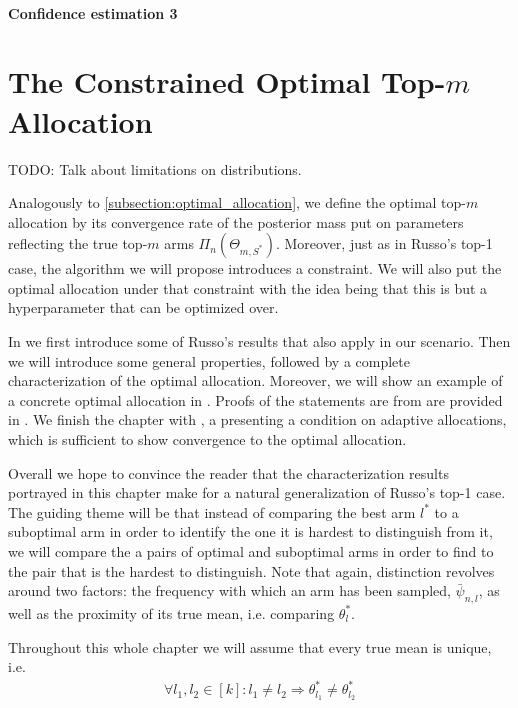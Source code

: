 \subsubsection{Confidence estimation 3}


\chapter{The Constrained Optimal Top-$m$ Allocation}

TODO: Talk about limitations on distributions.

Analogously to \ref{subsection:optimal_allocation}, we define the optimal top-$m$ allocation by its convergence rate of the posterior mass put on parameters reflecting the true top-$m$ arms $\Pi_n(\Theta_{m, S^*})$. Moreover, just as in Russo's top-1 case, the algorithm we will propose introduces a constraint. We will also put the optimal allocation under that constraint with the idea being that this is but a hyperparameter that can be optimized over.

In  we first introduce some of Russo's results that also apply in our scenario. Then we will introduce some general properties, followed by a complete characterization of the optimal allocation. Moreover, we will show an example of a concrete optimal allocation in . Proofs of the statements are from  are provided in . We finish the chapter with , a presenting a condition on adaptive allocations, which is sufficient to show convergence to the optimal allocation.

Overall we hope to convince the reader that the characterization results portrayed in this chapter make for a natural generalization of Russo's top-1 case. The guiding theme will be that instead of comparing the best arm $l^*$ to a suboptimal arm in order to identify the one it is hardest to distinguish from it, we will compare the a pairs of optimal and suboptimal arms in order to find to the pair that is the hardest to distinguish. Note that again, distinction revolves around two factors: the frequency with which an arm has been sampled, $\bar{\psi}_{n, l}$, as well as the proximity of its true mean, i.e. comparing $\theta^*_l$.

Throughout this whole chapter we will assume that every true mean is unique, i.e.
\begin{align}
  \forall l_1, l_2 \in [k]: l_1 \neq l_2 \Rightarrow \theta^*_{l_1} \neq \theta^*_{l_2}
\end{align}

